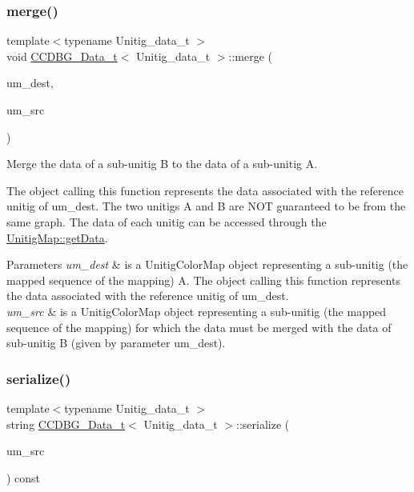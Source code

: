 \subsubsection{\texorpdfstring{merge()}{merge()}}
{\footnotesize\ttfamily template$<$typename Unitig\+\_\+data\+\_\+t $>$ \\
void \hyperlink{classCCDBG__Data__t}{C\+C\+D\+B\+G\+\_\+\+Data\+\_\+t}$<$ Unitig\+\_\+data\+\_\+t $>$\+::merge (\begin{DoxyParamCaption}\item[{const \hyperlink{classUnitigMap}{Unitig\+Color\+Map}$<$ U $>$ \&}]{um\+\_\+dest,  }\item[{const \hyperlink{classUnitigMap}{const\+\_\+\+Unitig\+Color\+Map}$<$ U $>$ \&}]{um\+\_\+src }\end{DoxyParamCaption})\hspace{0.3cm}{\ttfamily [inline]}}



Merge the data of a sub-\/unitig B to the data of a sub-\/unitig A. 

The object calling this function represents the data associated with the reference unitig of um\+\_\+dest. The two unitigs A and B are N\+OT guaranteed to be from the same graph. The data of each unitig can be accessed through the \hyperlink{classUnitigMap_a0c40fd1ba2df6af9a0c55b7963e41493}{Unitig\+Map\+::get\+Data}. 
\begin{DoxyParams}{Parameters}
{\em um\+\_\+dest} & is a Unitig\+Color\+Map object representing a sub-\/unitig (the mapped sequence of the mapping) A. The object calling this function represents the data associated with the reference unitig of um\+\_\+dest. \\
\hline
{\em um\+\_\+src} & is a Unitig\+Color\+Map object representing a sub-\/unitig (the mapped sequence of the mapping) for which the data must be merged with the data of sub-\/unitig B (given by parameter um\+\_\+dest). \\
\hline
\end{DoxyParams}
\mbox{\label{classCCDBG__Data__t_ab29386cdf5ae12239c0a87d510f7aa40}} 
\subsubsection{\texorpdfstring{serialize()}{serialize()}}
{\footnotesize\ttfamily template$<$typename Unitig\+\_\+data\+\_\+t $>$ \\
string \hyperlink{classCCDBG__Data__t}{C\+C\+D\+B\+G\+\_\+\+Data\+\_\+t}$<$ Unitig\+\_\+data\+\_\+t $>$\+::serialize (\begin{DoxyParamCaption}\item[{const \hyperlink{classUnitigMap}{const\+\_\+\+Unitig\+Color\+Map}$<$ U $>$ \&}]{um\+\_\+src }\end{DoxyParamCaption}) const\hspace{0.3cm}{\ttfamily [inline]}}



